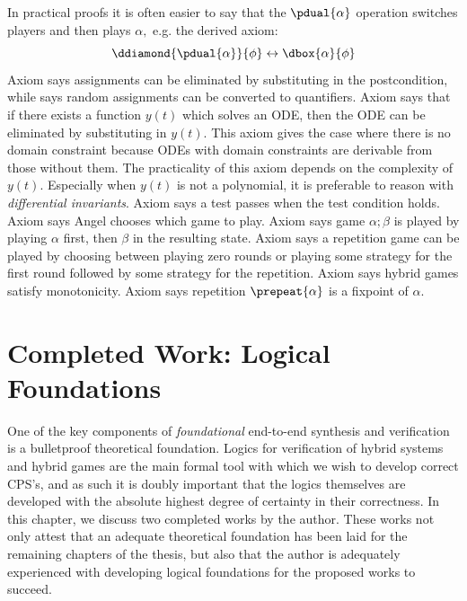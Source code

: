 \documentclass[12pt]{cmuthesis}
\theoremstyle{definition}
\theoremstyle{remark}
\newcommand{\lequiv}{\leftrightarrow}
\begin{document}
In practical proofs it is often easier to say that the $\pdual{\alpha}$ operation switches players and then plays $\alpha,$ e.g. the derived axiom:
\[\ddiamond{\pdual{\alpha}}{\phi} \lequiv \dbox{\alpha}{\phi}\]
Axiom  says assignments can be eliminated by substituting in the postcondition, while  says random assignments can be converted to quantifiers.
Axiom  says that if there exists a function $y(t)$ which solves an ODE, then the ODE can be eliminated by substituting in $y(t)$.
This axiom gives the case where there is no domain constraint because ODEs with domain constraints are derivable from those without them.
The practicality of this axiom depends on the complexity of $y(t)$. 
Especially when $y(t)$ is not a polynomial, it is preferable to reason with \emph{differential invariants}.
Axiom  says a test passes when the test condition holds.
Axiom  says Angel chooses which game to play.
Axiom  says game $\alpha;\beta$ is played by playing $\alpha$ first, then $\beta$ in the resulting state.
Axiom  says a repetition game can be played by choosing between playing zero rounds or playing some strategy for the first round followed by some strategy for the repetition.
Axiom  says hybrid games satisfy monotonicity.
Axiom  says repetition $\prepeat{\alpha}$ is a fixpoint of $\alpha$.

\chapter{Completed Work:  Logical Foundations}
\label{ch:logical-foundations}
One of the key components of \emph{foundational} end-to-end synthesis and verification is a bulletproof theoretical foundation.
Logics for verification of hybrid systems and hybrid games are the main formal tool with which we wish to develop correct CPS's, and as such it is doubly important that the logics themselves are developed with the absolute highest degree of certainty in their correctness.
In this chapter, we discuss two completed works by the author.
These works not only attest that an adequate theoretical foundation has been laid for the remaining chapters of the thesis, but also that the author is adequately experienced with developing logical foundations for the proposed works to succeed.
\end{document}

